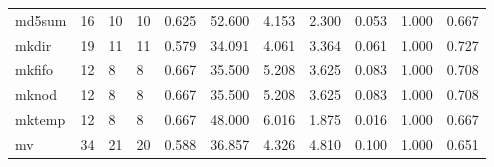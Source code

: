 \begin{longtable}{lp{1.2cm}p{1.2cm}p{1.2cm}p{1.2cm}p{1.2cm}p{1.2cm}p{1.2cm}p{1.2cm}p{1.2cm}p{1.2cm}}
md5sum    &                           16 &                 10 &                                10 &                                      0.625 &                                 52.600 &                                        4.153 &                             2.300 &                                   0.053 &                              1.000 &                                              0.667 \\
mkdir     &                           19 &                 11 &                                11 &                                      0.579 &                                 34.091 &                                        4.061 &                             3.364 &                                   0.061 &                              1.000 &                                              0.727 \\
mkfifo    &                           12 &                  8 &                                 8 &                                      0.667 &                                 35.500 &                                        5.208 &                             3.625 &                                   0.083 &                              1.000 &                                              0.708 \\
mknod     &                           12 &                  8 &                                 8 &                                      0.667 &                                 35.500 &                                        5.208 &                             3.625 &                                   0.083 &                              1.000 &                                              0.708 \\
mktemp    &                           12 &                  8 &                                 8 &                                      0.667 &                                 48.000 &                                        6.016 &                             1.875 &                                   0.016 &                              1.000 &                                              0.667 \\
mv        &                           34 &                 21 &                                20 &                                      0.588 &                                 36.857 &                                        4.326 &                             4.810 &                                   0.100 &                              1.000 &                                              0.651 \\

\end{longtable}
